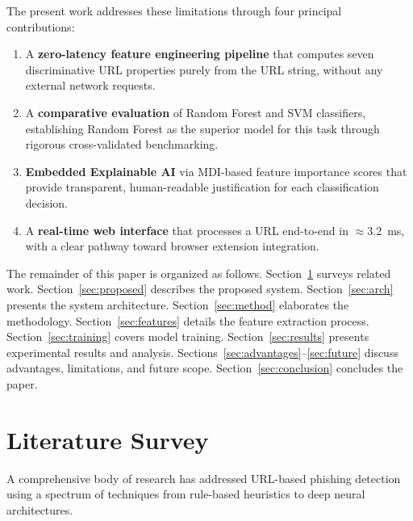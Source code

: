 \documentclass[conference]{IEEEtran}
\begin{document}
The present work addresses these limitations through four principal 
contributions:

\begin{enumerate}[leftmargin=*, label=\arabic*.]
    \item A \textbf{zero-latency feature engineering pipeline} that 
    computes seven discriminative URL properties purely from the URL 
    string, without any external network requests.
    
    \item A \textbf{comparative evaluation} of Random Forest and SVM 
    classifiers, establishing Random Forest as the superior model for 
    this task through rigorous cross-validated benchmarking.
    
    \item \textbf{Embedded Explainable AI} via MDI-based feature 
    importance scores that provide transparent, human-readable 
    justification for each classification decision.
    
    \item A \textbf{real-time web interface} that processes a URL 
    end-to-end in $\approx$3.2~ms, with a clear pathway toward 
    browser extension integration.
\end{enumerate}

The remainder of this paper is organized as follows. 
Section~\ref{sec:litsurvey} surveys related work. 
Section~\ref{sec:proposed} describes the proposed system. 
Section~\ref{sec:arch} presents the system architecture. 
Section~\ref{sec:method} elaborates the methodology. 
Section~\ref{sec:features} details the feature extraction process. 
Section~\ref{sec:training} covers model training. 
Section~\ref{sec:results} presents experimental results and analysis. 
Sections~\ref{sec:advantages}--\ref{sec:future} discuss advantages, 
limitations, and future scope. 
Section~\ref{sec:conclusion} concludes the paper.

\section{Literature Survey}
\label{sec:litsurvey}

A comprehensive body of research has addressed URL-based phishing 
detection using a spectrum of techniques from rule-based heuristics to 
deep neural architectures.
\end{document}

